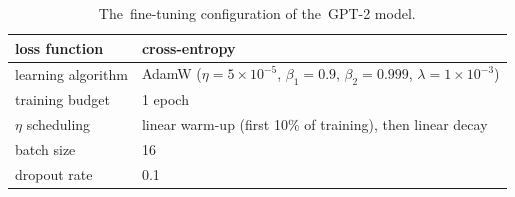 \documentclass[bsc,frontabs,singlespacing,parskip,deptreport]{infthesis}
\begin{document}
{{{      \begin{table}[h!t]
      \centering
      \footnotesize
      \begin{tabular}{m{}m{}}
      \toprule
      loss function & cross-entropy \\
      \hline
      learning algorithm & AdamW ($\eta=5\times10^{-5}$, $\beta_1=0.9$, $\beta_2=0.999$, $\lambda=1\times10^{-3}$) \\
      \hline
      training budget & 1 epoch \\
      \hline
      $\eta$ scheduling & linear warm-up (first 10\% of training), then linear decay \\
      \hline
      batch size & 16 \\
      \hline
      dropout rate & 0.1 \\
      \bottomrule
      \end{tabular}
      \caption{The~fine-tuning configuration of the~GPT-2 model.}
      \label{tab:config-gpt-2}
      \end{table}
    }

}}
\end{document}
